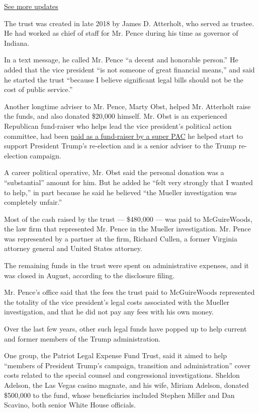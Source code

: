 \href{https://www.nytimes.com/2020/07/31/us/elections/biden-vs-trump.html?action=click\&pgtype=Article\&state=default\&region=MAIN_CONTENT_1\&context=storylines_live_updates}{See
more updates}

The trust was created in late 2018 by James D. Atterholt, who served as
trustee. He had worked as chief of staff for Mr. Pence during his time
as governor of Indiana.

In a text message, he called Mr. Pence ``a decent and honorable
person.'' He added that the vice president ``is not someone of great
financial means,'' and said he started the trust ``because I believe
significant legal bills should not be the cost of public service.''

Another longtime adviser to Mr. Pence, Marty Obst, helped Mr. Atterholt
raise the funds, and also donated \$20,000 himself. Mr. Obst is an
experienced Republican fund-raiser who helps lead the vice president's
political action committee, had been
\href{https://www.nytimes.com/2017/07/09/us/politics/at-private-dinners-pence-quietly-courts-big-donors-and-corporate-executives.html}{paid
as a fund-raiser by a super PAC} he helped start to support President
Trump's re-election and is a senior adviser to the Trump re-election
campaign.

A career political operative, Mr. Obst said the personal donation was a
``substantial'' amount for him. But he added he ``felt very strongly
that I wanted to help,'' in part because he said he believed ``the
Mueller investigation was completely unfair.''

Most of the cash raised by the trust --- \$480,000 --- was paid to
McGuireWoods, the law firm that represented Mr. Pence in the Mueller
investigation. Mr. Pence was represented by a partner at the firm,
Richard Cullen, a former Virginia attorney general and United States
attorney.

The remaining funds in the trust were spent on administrative expenses,
and it was closed in August, according to the disclosure filing.

Mr. Pence's office said that the fees the trust paid to McGuireWoods
represented the totality of the vice president's legal costs associated
with the Mueller investigation, and that he did not pay any fees with
his own money.

Over the last few years, other such legal funds have popped up to help
current and former members of the Trump administration.

One group, the Patriot Legal Expense Fund Trust, said it aimed to help
``members of President Trump's campaign, transition and administration''
cover costs related to the special counsel and congressional
investigations. Sheldon Adelson, the Las Vegas casino magnate, and his
wife, Miriam Adelson, donated \$500,000 to the fund, whose beneficiaries
included Stephen Miller and Dan Scavino, both senior White House
officials.

